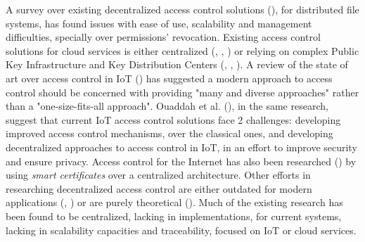 A survey over existing decentralized access control solutions (\cite{miltchev_decentralized_2008}), for distributed file systems, has found issues with ease of use, scalability and management difficulties, specially over permissions' revocation. Existing access control solutions for cloud services is either centralized (\cite{calero_toward_2010}, \cite{ruj_dacc:_2011}, \cite{yu_achieving_2010}) or relying on complex Public Key Infrastructure and Key Distribution Centers (\cite{ruj_privacy_2012}, \cite{ruj_decentralized_2014}, \cite{bauer_distributed_2005}). A review of the state of art over access control in IoT (\cite{ouaddah_access_2017}) has suggested a modern approach to access control should be concerned with providing "many and diverse approaches" rather than a "one-size-fits-all approach". Ouaddah et al. (\cite{ouaddah_access_2017}), in the same research, suggest that current IoT access control solutions face 2 challenges: developing improved access control mechanisms, over the classical ones, and developing decentralized approaches to access control in IoT, in an effort to improve security and ensure privacy. Access control for the Internet has also been researched (\cite{park_rbac_1999}) by using \textit{smart certificates} over a centralized architecture. Other efforts in researching decentralized access control are either outdated for modern applications (\cite{satyanarayanan_integrating_1989}, \cite{karger_non-discretionary_1977}) or are purely theoretical (\cite{thomas_towards_1993}). Much of the existing research has been found to be centralized, lacking in implementations, for current systems, lacking in scalability capacities and traceability, focused on IoT or cloud services.

